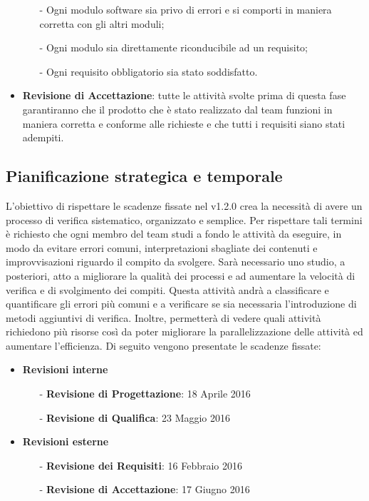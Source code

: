\begin{itemize}
\begin{itemize}
\item[-] Ogni modulo software sia privo di errori e si comporti in maniera corretta con gli altri moduli;
\item[-] Ogni modulo sia direttamente riconducibile ad un requisito;
\item[-] Ogni requisito obbligatorio sia stato soddisfatto.
\end{itemize}
\item \textbf{Revisione di Accettazione}: tutte le attività svolte prima di questa fase garantiranno che il prodotto che è stato realizzato dal team \gruppo \hspace{1mm} funzioni in maniera corretta e conforme alle richieste e che tutti i requisiti siano stati adempiti.
\end{itemize}


\subsection{Pianificazione strategica e temporale}
L’obiettivo di rispettare le scadenze fissate nel \PdP v1.2.0 crea la necessità di avere un processo di verifica sistematico, organizzato e semplice. Per rispettare tali termini è richiesto che ogni membro del team studi a fondo le attività da eseguire, in modo da evitare errori comuni, interpretazioni sbagliate dei contenuti e improvvisazioni riguardo il compito da svolgere. Sarà necessario uno studio, a posteriori, atto a migliorare la qualità dei processi e ad aumentare la velocità di verifica e di svolgimento dei compiti. Questa attività andrà a classificare e quantificare gli errori più comuni e a verificare se sia necessaria l’introduzione di metodi aggiuntivi di verifica. Inoltre, permetterà di vedere quali attività richiedono più risorse così da poter migliorare la parallelizzazione delle attività ed aumentare l’efficienza. Di seguito vengono presentate le scadenze fissate:
\begin{itemize}
\item \textbf{Revisioni interne}
\begin{itemize}
\item[-] \textbf{Revisione di Progettazione}: 18 Aprile 2016
\item[-] \textbf{Revisione di Qualifica}: 23 Maggio 2016
\end{itemize}
\item \textbf{Revisioni esterne}
\begin{itemize}
\item[-] \textbf{Revisione dei Requisiti}: 16 Febbraio 2016
\item[-] \textbf{Revisione di Accettazione}: 17 Giugno 2016
\end{itemize}
\end{itemize}


